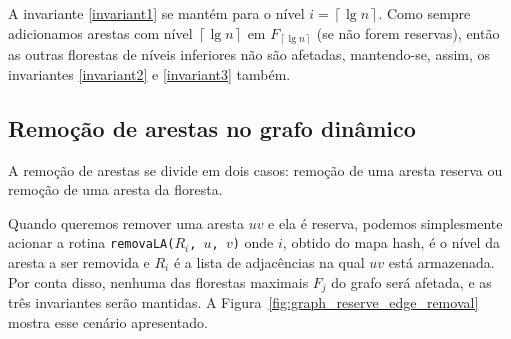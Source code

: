 A invariante \ref{invariant1} se mantém para o nível $i = \left\lceil \lg n \right\rceil$. Como sempre adicionamos arestas com nível $\left\lceil \lg n \right\rceil$ em $F_{\left\lceil \lg n \right\rceil}$ (se não forem reservas), então as outras florestas de níveis inferiores não são afetadas, mantendo-se, assim, os invariantes \ref{invariant2} e \ref{invariant3} também.























































\subsection{Remoção de arestas no grafo dinâmico}
\label{sec:dynamic-graph-edge-removal}

A remoção de arestas se divide em dois casos: remoção de uma aresta reserva ou remoção de uma aresta da floresta.

Quando queremos remover uma aresta $uv$ e ela é reserva, podemos simplesmente acionar a rotina \texttt{removaLA($R_i$, $u$, $v$)} onde $i$, obtido do mapa hash, é o nível da aresta a ser removida e $R_i$ é a lista de adjacências na qual $uv$ está armazenada. Por conta disso, nenhuma das florestas maximais $F_j$ do grafo será afetada, e as três invariantes serão mantidas. A Figura~\ref{fig:graph_reserve_edge_removal} mostra esse cenário apresentado.

